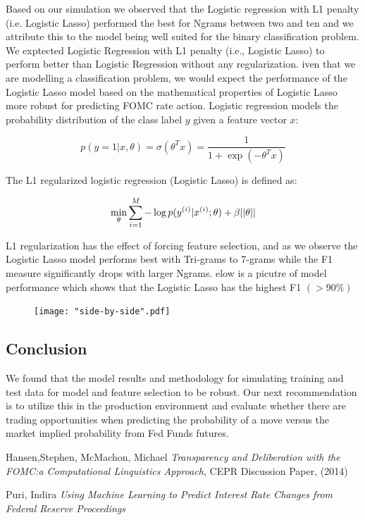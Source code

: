 \documentclass[11pt]{article}
\newcommand{\vertSpace}[1]{\vspace{3mm}}
\begin{document}
Based on our simulation we observed that the Logistic regression with L1 penalty (i.e. Logistic Lasso) performed the best for Ngrams between two and ten and we attribute this to the model being well suited for the binary classification problem.  We exptected Logistic Regression with L1 penalty (i.e., Logistic Lasso) to perform better than Logistic Regression without any regularization.  \vertSpace 

Given that we are modelling a classification problem, we would expect the performance of the Logistic Lasso model based on the mathematical properties of Logistic Lasso more robust for predicting FOMC rate action.  Logistic regression models the probability distribution of the class label $y$ given a feature vector $x$: 

$$p(y=1|x,\theta) = \sigma(\theta^T x) = \frac{1}{1+\exp(-\theta^Tx)}$$

The L1 regularized logistic regression (Logistic Lasso) is defined as: 

$$\underset{\rm \theta}{\rm min} \sum_{i=1}^M -\log p(y^{(i)}|x^{(i)}; \theta) + \beta ||\theta||$$

L1 regularization has the effect of forcing feature selection, and as we observe the Logistic Lasso model performs best with Tri-grams to 7-grams while the F1 measure significantly drops with larger Ngrams.  \vertSpace 


Below is a picutre of model performance which shows that the Logistic Lasso has the highest F1 $(>90\%)$

\begin{figure}[H]
\texttt{[image: "side-by-side".pdf]}
\end{figure}


\subsection{Conclusion}


We found that the model results and methodology for simulating training and test data for model and feature selection to be robust.  Our next recommendation is to utilize this in the production environment and evaluate whether there are trading opportunities when predicting the probability of a move versus the market implied probability from Fed Funds futures.  


\begin{thebibliography}{99}

 Hansen,Stephen, McMachon, Michael  \emph{Transparency and Deliberation with the FOMC:a Computational Linquistics Approach}, CEPR Discussion Paper, (2014)

 Puri, Indira \emph{Using Machine Learning to Predict Interest Rate Changes from Federal Reserve Proceedings}
\end{thebibliography}
\end{document}
